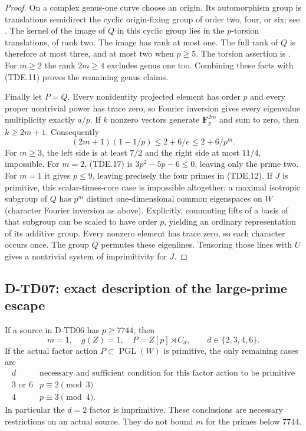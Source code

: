\begin{proof}
On a complex genus-one curve choose an origin.  Its automorphism
group is translations semidirect the cyclic origin-fixing group of
order two, four, or six; see
\cite[ChapterIV, Proposition7.13 and Remark7.18, pp.~140--141]{TD:MilneEC2021}.
The kernel of the image of $Q$ in this cyclic group lies in the
$p$-torsion translations, of rank two.  The image has rank at most
one.  The full rank of $Q$ is therefore at most three, and at most
two when $p\ge5$.  The torsion assertion is
\cite[ChapterII, Proposition6.3, p.~70]{TD:MilneEC2021}.
For $m\ge2$ the rank $2m\ge4$ excludes genus one too.  Combining
these facts with (TDE.11) proves the remaining genus claims.

Finally let $P=Q$.  Every nonidentity projected element has order
$p$ and every proper nontrivial power has trace zero, so Fourier
inversion gives every eigenvalue multiplicity exactly $a/p$.
If $k$ nonzero vectors generate $\mathbf F_p^{2m}$ and sum to zero,
then $k\ge2m+1$.  Consequently
\[
      (2m+1)(1-1/p)\le 2+6/e\le 2+6/p^m.
      \tag{TDE.17}
\]
For $m\ge3$, the left side is at least $7/2$ and the right side
at most $11/4$, impossible.  For $m=2$, (TDE.17) is
$3p^2-5p-6\le0$, leaving only the prime two.  For $m=1$ it gives
$p\le9$, leaving precisely the four primes in (TDE.12).
If $J$ is primitive, this scalar-times-core case is impossible
altogether: a maximal isotropic subgroup of $Q$ has $p^m$ distinct
one-dimensional common eigenspaces on $W$ (character Fourier
inversion as above).  Explicitly, commuting lifts of a basis of that
subgroup can be scaled to have order $p$, yielding an ordinary
representation of its additive group.  Every nonzero element has
trace zero, so each character occurs once.  The group $Q$ permutes
these eigenlines.  Tensoring those lines
with $U$ gives a nontrivial system of imprimitivity for $J$.
\end{proof}

\subsection{D-TD07: exact description of the large-prime escape}

\begin{theorem}[D-TD07]
If a source in D-TD06 has $p\ge7744$, then
\[
     m=1,\quad g(Z)=1,\quad
     P=Z[p]\rtimes C_d,\qquad d\in\{2,3,4,6\}.
     \tag{TDE.18}
\]
If the actual factor action $P\subset\operatorname{PGL}(W)$ is
primitive, the only remaining cases are
\[
 \begin{array}{c|c}
 d&\text{necessary and sufficient condition for this factor action
 to be primitive}\\ \hline
 3\text{ or }6&p\equiv2\pmod3\\
 4&p\equiv3\pmod4 .
 \end{array}
 \tag{TDE.19}
\]
In particular the $d=2$ factor is imprimitive.  These conclusions
are necessary restrictions on an actual source.  They do not bound
$m$ for the primes below $7744$.
\end{theorem}

